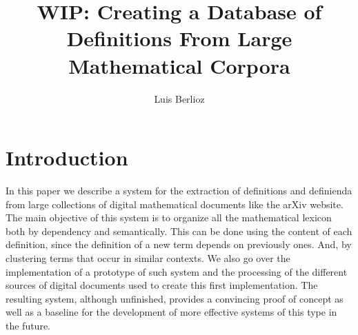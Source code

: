 \documentclass[a4paper]{easychair}
\author{Luis Berlioz}
\title{WIP: Creating a Database of Definitions From Large Mathematical Corpora}
\begin{document}
\maketitle
\begin{abstract}
   
\end{abstract}
\section{Introduction}
In this paper we describe a system for the extraction of definitions and definienda from large collections of digital mathematical documents like the arXiv website. The main objective of this system is to organize all the mathematical lexicon both by dependency and semantically. This can be done using the content of each  definition, since the definition of a new term depends on previously ones. And, by clustering terms that occur in similar contexts. We also go over the implementation of a prototype of such system and the processing of the different sources of digital documents used to create this first implementation. The resulting system, although unfinished, provides a convincing proof  of concept as well as a baseline for the development of more effective systems of this type in the future.
\end{document}

